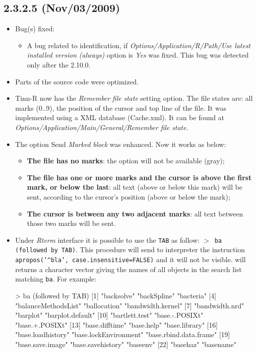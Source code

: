 \subsection*{2.3.2.5 (Nov/03/2009)}
\begin{itemize}
  \item Bug(s) fixed:
    \begin{itemize}
      \item A bug related to \RR{} identification, if
        \textit{Options/Application/R/Path/Use latest installed version (always)}
        option is \textit{Yes} was fixed. This bug was detected only after the
        \RR{} 2.10.0.
    \end{itemize}
  \item Parts of the source code were optimized.
  \item Tinn-R now has the \textit{Remember file state} setting option. The
    file states are: all marks (0..9), the position of the cursor and top line
    of the file. It was implemented using a XML database (Cache.xml). It can
    be found at \textit{Options/Application/Main/General/Remember file state}.
  \item The option Send \textit{Marked block} was enhanced. Now it works as below:
    \begin{itemize}
      \item \textbf{The file has no marks}: the option will not be available
        (gray);
      \item \textbf{The file has one or more marks and the cursor is above
          the first mark, or below the last}: all text (above or below 
        this mark) will be sent, according to the cursor's position (above
        or below the mark);
      \item \textbf{The cursor is between any two adjacent marks}: all text
        between those two marks will be sent.
    \end{itemize}
  \item Under \textit{Rterm} interface it is possible to use the \texttt{TAB} as
    follow: \texttt{$>$ ba (followed by TAB)}. This procedure will
    send to \RR{} interpreter the instruction
    \texttt{apropos('\^{}bla', case.insensitive=FALSE)} and it will not be
    visible. \RR{} will returns a character vector giving the names of all
    objects in the search list matching \texttt{ba}. For example:

    \begin{Scode}
      > ba (followed by TAB)
      [1] "backsolve"             "backSpline"            "bacteria"
      [4] "balanceMethodsList"    "ballocation"           "bandwidth.kernel"
      [7] "bandwidth.nrd"         "barplot"               "barplot.default"
      [10] "bartlett.test"         "base.-.POSIXt"         "base.+.POSIXt"
      [13] "base.difftime"         "base.help"             "base.library"
      [16] "base.loadhistory"      "base.lockEnvironment"  "base.rbind.data.frame"
      [19] "base.save.image"       "base.savehistory"      "baseenv"
      [22] "basehaz"               "basename"


\end{Scode}
\end{itemize}
